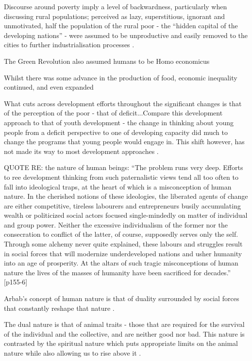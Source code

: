Discourse around poverty imply a level of backwardness, particularly when discussing rural populations; perceived as lazy, superstitious, ignorant and unmotivated, half the population of the rural poor - the “hidden capital of the developing nations” - were assumed to be unproductive and easily removed to the cities to further industrialisation processes \citep{Arbab2000}.

The Green Revolution also assumed humans to be Homo economicus \citep{Arbab2000}

Whilst there was some advance in the production of food, economic inequality continued, and even expanded \citep{Arbab2000}

What cuts across development efforts throughout the significant changes is that of the perception of the poor - that of deficit...Compare this development approach to that of youth development - the change in thinking about young people from a deficit perspective to one of developing capacity did much to change the programs that young people would engage in. This shift however, has not made its way to most development approaches \citep{Arbab2000}.

QUOTE RE: the nature of human beings: “The problem runs very deep. Efforts to ree development thinking from such paternalistic views tend all too often to fall into ideological traps, at the heart of which is a misconception of human nature. In the cherished notions of these ideologies, the liberated agents of change are either competitive, tireless labourers and entrepreneurs busily accumulating wealth or politicized social actors focused single-mindedly on matter of individual and group power. Neither the excessive individualism of the former nor the consecration to conflict of the latter, of course, supposedly serves only the self. Through some alchemy never quite explained, these labours and struggles result in social forces that will modernize underdeveloped nations and usher humanity into an age of prosperity. At the altars of such tragic misconceptions of human nature the lives of the masses of humanity have been sacrificed for decades.” [p155-6]  \citep{Arbab2000}

Arbab's concept of human nature is that of duality surrounded by social forces that constantly reshape that nature \citep{Arbab2000}.

The dual nature is that of animal traits - those that are required for the survival of the individual and the collective, and are neither good nor bad. This nature is contrasted by the spiritual nature which puts appropriate limits on the animal nature while also allowing us to rise above it \citep{Arbab2000}.

